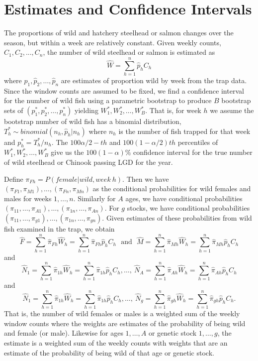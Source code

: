 \documentclass[12pt]{article}
\begin{document}
\section{Estimates and Confidence Intervals}
The proportions of wild and hatchery steelhead or salmon changes over the season, but within a week are relatively constant. Given weekly counts, \(C_1,C_2,...,C_n\),   the number of wild steelhead or salmon is estimated as
\[\hat{W}=\sum\limits_{h=1}^{n} \hat{p}_hC_h\]	  
where \(\hat{p}_1, \hat{p}_2, \ldots, \hat{p}_n \) are estimates of proportion wild by week from the trap data.  Since the window counts are assumed to be fixed, we find a confidence interval for the number of wild fish using a parametric  bootstrap to produce $B$ bootstrap sets of \((p^*_1, p^*_2, \ldots, p^*_n)\) yielding \(W^*_1, W^*_2, \ldots, W^*_B\).   That is, for week $h$ we assume the bootstrap number of wild fish has a binomial distribution,  \(T^*_h\sim binomial(n_h,\hat{p}_h|n_h)\) where \(n_h\)  is the number of fish trapped for that  week and \(p^*_h = T^*_h/n_h\).  The \(100\alpha/2-th\) and \(100(1- \alpha/2)th\) percentiles of \(W^*_1, W^*_2, \ldots, W^*_B\) give us the \(100(1-\alpha)\%\) confidence interval for the true number of wild steelhead or Chinook passing LGD for the year.

Define \(\pi_{Fh} = P(female|wild,week \: h)\).  Then we have \((\pi_{F1},\pi_{M1}),\ldots,(\pi_{Fn},\pi_{Mn})\) as the conditional probabilities for wild females and males for weeks \(1,\ldots,n\).  Similarly for $A$ ages, we have conditional probabilities \((\pi_{11}, \ldots, \pi_{A1}), \ldots,(\pi_{1n}, \ldots, \pi_{An})\). For $g$ stocks, we have conditional probabilities \((\pi_{11}, \ldots, \pi_{g1}), \ldots,(\pi_{1n}, \ldots, \pi_{gn})\). Given estimates of these probabilities from wild fish examined in the trap, we obtain  
\[\hat{F} =\sum\limits_{h=1}^{n}\hat{\pi}_{Fh}\hat{W}_h = \sum\limits_{h=1}^{n}\hat{\pi}_{Fh}\hat{p}_{h}C_h ~~~ \mathrm{and}  ~~~ \hat{M} =\sum\limits_{h=1}^{n}\hat{\pi}_{Mh}\hat{W}_h = \sum\limits_{h=1}^{n}\hat{\pi}_{Mh}\hat{p}_{h}C_h \]
and
\[\hat{N}_1 =\sum\limits_{h=1}^{n}\hat{\pi}_{1h}\hat{W}_h = \sum\limits_{h=1}^{n}\hat{\pi}_{1h}\hat{p}_{h}C_h, \ldots, \ \hat{N}_A =\sum\limits_{h=1}^{n}\hat{\pi}_{Ah}\hat{W}_h = \sum\limits_{h=1}^{n}\hat{\pi}_{Ah}\hat{p}_{h}C_{h}\]
and
\[\hat{N}_1 =\sum\limits_{h=1}^{n}\hat{\pi}_{1h}\hat{W}_h = \sum\limits_{h=1}^{n}\hat{\pi}_{1h}\hat{p}_{h}C_h, \ldots, \ \hat{N}_g =\sum\limits_{h=1}^{n}\hat{\pi}_{gh}\hat{W}_h = \sum\limits_{h=1}^{n}\hat{\pi}_{gh}\hat{p}_{h}C_{h}.\]
That is, the number of wild females or males is a weighted sum of the weekly window counts where the weights are estimates of the probability of being wild and female (or male).  Likewise for ages \(1, \ldots, A\) or genetic stock \(1, \ldots, g\), the estimate is a weighted sum of the weekly counts with weights that are an estimate of the probability of being wild of that age or genetic stock.
\end{document}
